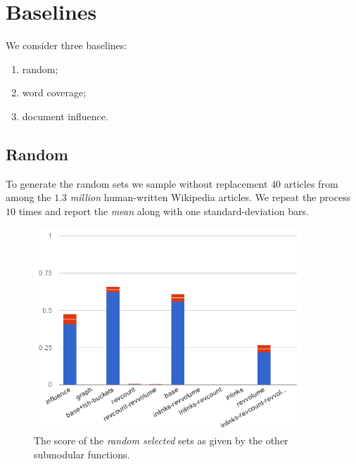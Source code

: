 \section{Baselines}

We consider three baselines:
\begin{enumerate}
  \item random;
  \item word coverage;
  \item document influence.
\end{enumerate}

\subsection{Random}

To generate the random sets we sample without replacement \(40\) articles from
among the \(1.3\) \emph{million} human-written Wikipedia articles. We repeat
the process \(10\) times and report the \emph{mean} along with one
standard-deviation bars.

\begin{figure}
  \centering
  \includegraphics[width=0.9\textwidth,natwidth=555,natheight=419]{images/rand-mean.png}
  \caption{The score of the \emph{random selected} sets as given by the other
  submodular functions.}
  \label{img:rand-mean}
\end{figure}

